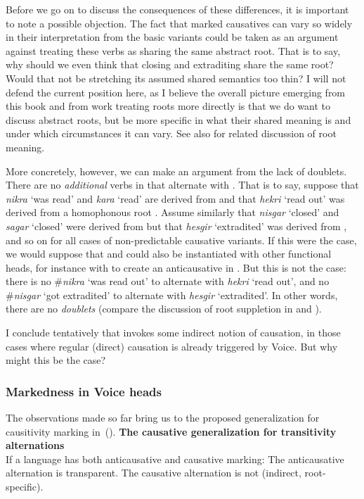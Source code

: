 Before we go on to discuss the consequences of these differences, it is important to note a possible objection. The fact that marked causatives can vary so widely in their interpretation from the basic variants could be taken as an argument against treating these verbs as sharing the same abstract root. That is to say, why should we even think that closing and extraditing share the same root? Would that not be stretching its assumed shared semantics too thin? I will not defend the current position here, as I believe the overall picture emerging from this book and from work treating roots more directly is that we do want to discuss abstract roots, but be more specific in what their shared meaning is and under which circumstances it can vary. See also \cite{kastnertucker19cup} for related discussion of root meaning.

More concretely, however, we can make an argument from the lack of doublets. There are no \emph{additional} verbs in {\tnif} that alternate with {\thif}. That is to say, suppose that \emph{nikra} `was read' and \emph{kara} `read' are derived from  and that \emph{hekri} `read out' was derived from a homophonous root . Assume similarly that \emph{nisgar} `closed' and \emph{sagar} `closed' were derived from  but that \emph{hesgir} `extradited' was derived from , and so on for all cases of non-predictable causative variants. If this were the case, we would suppose that  and  could also be instantiated with other functional heads, for instance with {\vz} to create an anticausative in {\tnif}. But this is not the case: there is no \#\emph{nikra} `was read out' to alternate with \emph{hekri} `read out', and no \#\emph{nisgar} `got extradited' to alternate with \emph{hesgir} `extradited'. In other words, there are no \emph{doublets} (compare the discussion of root suppletion in \citealt{harley14thlia,harley14thlib,harley15roots} and \citealt{borer14thli}).

I conclude tentatively that {\vd} invokes some indirect notion of causation, in those cases where regular (direct) causation is already triggered by Voice. But why might this be the case?

			\subsubsection{Markedness in Voice heads} \label{vd:caus:markvoice}
The observations made so far bring us to the proposed generalization for causitivity marking in~(\nextx).
\pex\label{ex:vd:causgen}\textbf{The causative generalization for transitivity alternations}\\
	If a language has both anticausative and causative marking:
	\a The anticausative alternation is transparent.
	\a The causative alternation is not (indirect, root-specific).
\xe

